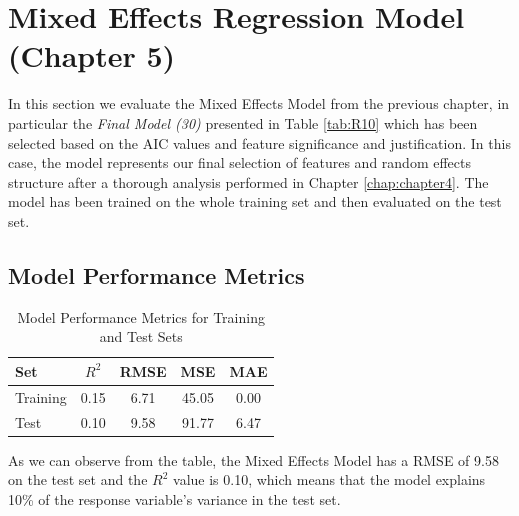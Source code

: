 \section{Mixed Effects Regression Model (Chapter 5)}
In this section we evaluate the Mixed Effects Model from the previous chapter, in particular the \textit{Final Model (30)} presented in Table \ref{tab:R10} which has been selected based on the AIC values and feature significance and justification. In this case, the model represents our final selection of features and random effects structure after a thorough analysis performed in Chapter \ref{chap:chapter4}. The model has been trained on the whole training set and then evaluated on the test set.

\subsection{Model Performance Metrics}
\begin{table}[H]
    \centering
    \caption{Model Performance Metrics for Training and Test Sets}
    \label{tab:model_performance}
    \begin{tabular}{lcccc}
    \hline
    Set & $R^2$ & RMSE & MSE & MAE \\ 
    \hline
    Training & 0.15 & 6.71 & 45.05 & 0.00 \\
    Test & 0.10 & 9.58 & 91.77 & 6.47 \\
    \hline
    \end{tabular}
\end{table}    

\noindent As we can observe from the table, the Mixed Effects Model has a RMSE of 9.58 on the test set and the $R^2$ value is 0.10, which means that the model explains 10\% of the response variable's variance in the test set. 
